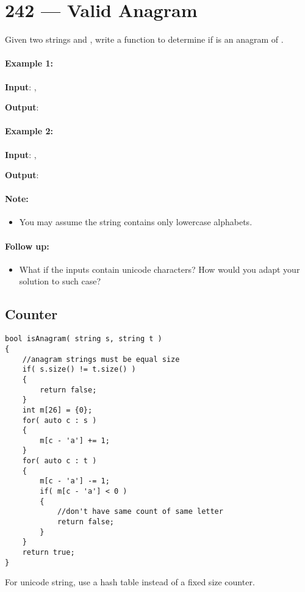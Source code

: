 \section{242 --- Valid Anagram}
Given two strings  and  , write a function to determine if   is an anagram of  .

\paragraph{Example 1:}

\begin{flushleft}
\textbf{Input}: , 

\textbf{Output}: 

\end{flushleft}

\paragraph{Example 2:}

\begin{flushleft}
\textbf{Input}: , 

\textbf{Output}: 

\end{flushleft}

\paragraph{Note:}

\begin{itemize}
\item You may assume the string contains only lowercase alphabets.
\end{itemize}

\paragraph{Follow up:}
\begin{itemize}
\item What if the inputs contain unicode characters? How would you adapt your solution to such case?
\end{itemize}

\subsection{Counter}

\setcounter{lstlisting}{0}
\begin{lstlisting}[style=customc, caption={Counter}]
bool isAnagram( string s, string t )
{
    //anagram strings must be equal size
    if( s.size() != t.size() )
    {
        return false;
    }
    int m[26] = {0};
    for( auto c : s )
    {
        m[c - 'a'] += 1;
    }
    for( auto c : t )
    {
        m[c - 'a'] -= 1;
        if( m[c - 'a'] < 0 )
        {
            //don't have same count of same letter
            return false;
        }
    }
    return true;
}
\end{lstlisting}

For unicode string, use a hash table instead of a fixed size counter. 